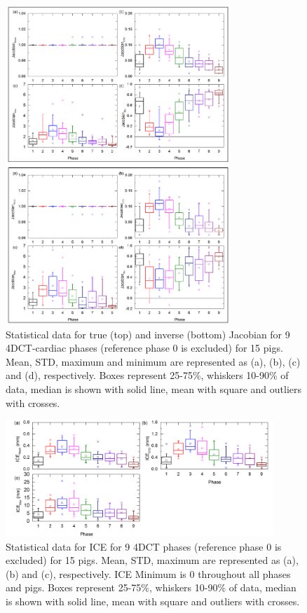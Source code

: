 \documentclass[type=dr, dr=rernat, accentcolor=tud7b,colorbacktitle, bigchapter, openright, twoside, 12pt ]{tudthesis}
\begin{document}
\begin{figure}[H]
	\begin{center}		
		\includegraphics[width=0.75\textwidth]{./Images/Jacobian_data_pigs.png}
		\caption{Statistical data for true (top) and inverse (bottom) Jacobian for 9 4DCT-cardiac phases (reference phase 0 is excluded) for 15 pigs. Mean, STD, maximum and minimum are represented as (a), (b), (c) and (d), respectively.
		Boxes represent 25-75\%, whiskers 10-90\% of data, median is shown with solid line, mean with square and outliers with crosses.}
		\label{jacobian_data_pigs}
	\end{center}
\end{figure}

\newpage

\begin{figure}[H]
	\begin{center}		
		\includegraphics[width=0.9\textwidth]{./Images/ICE_pigs.png}
		\caption{Statistical data for ICE for 9 4DCT phases (reference phase 0 is excluded) for 15 pigs. Mean, STD, maximum are represented as (a), (b) and (c), respectively. ICE Minimum is 0 throughout all phases and pigs.
		Boxes represent 25-75\%, whiskers 10-90\% of data, median is shown with solid line, mean with square and outliers with crosses.}
		\label{ice_pigs}
	\end{center}
\end{figure}
\end{document}
